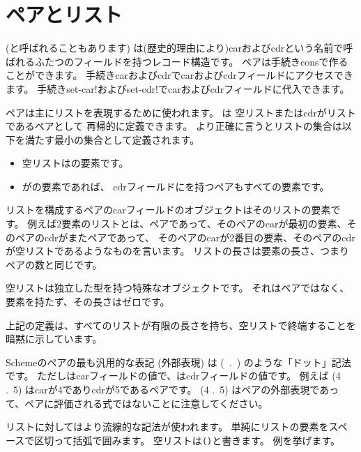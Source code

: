 \section{ペアとリスト}
\label{listsection}

 (と呼ばれることもあります)
は(歴史的理由により)carおよびcdrという名前で呼ばれるふたつのフィールドを持つレコード構造です。
ペアは手続き{\cf cons}で作ることができます。
手続き{\cf car}および{\cf cdr}でcarおよびcdrフィールドにアクセスできます。
手続き{\cf set-car!}および{\cf set-cdr!}でcarおよびcdrフィールドに代入できます。

ペアは主にリストを表現するために使われます。
は
空リストまたはcdrがリストであるペアとして
再帰的に定義できます。
より正確に言うとリストの集合は以下を満たす最小の集合として定義されます。

\begin{itemize}
\item 空リストはの要素です。
\item {}がの要素であれば、
      cdrフィールドにを持つペアもすべての要素です。
\end{itemize}

リストを構成するペアのcarフィールドのオブジェクトはそのリストの要素です。
例えば2要素のリストとは、ペアであって、そのペアのcarが最初の要素、そのペアのcdrがまたペアであって、
そのペアのcarが2番目の要素、そのペアのcdrが空リストであるようなものを言います。
リストの長さは要素の長さ、つまりペアの数と同じです。

空リストは独立した型を持つ特殊なオブジェクトです。
それはペアではなく、要素を持たず、その長さはゼロです。

\begin{note}
上記の定義は、すべてのリストが有限の長さを持ち、空リストで終端することを暗黙に示しています。
\end{note}

Schemeのペアの最も汎用的な表記 (外部表現) は
\hbox{\cf ( .\ )}
のような「ドット」記法です。
ただしはcarフィールドの値で、はcdrフィールドの値です。
例えば {\cf (4 .\ 5)} はcarが4でありcdrが5であるペアです。
{\cf (4 .\ 5)} はペアの外部表現であって、ペアに評価される式ではないことに注意してください。

リストに対してはより流線的な記法が使われます。
単純にリストの要素をスペースで区切って括弧で囲みます。
空リストは{\tt()}と書きます。
例を挙げます。

